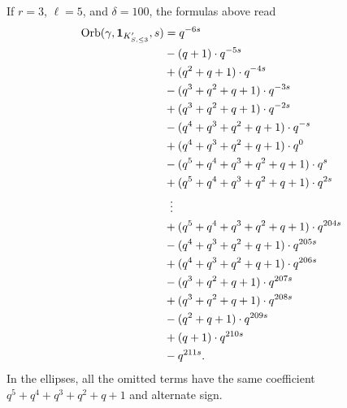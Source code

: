 \begin{example}
  If $r=3$, $\ell=5$, and $\delta=100$, the formulas above read
  \begin{align*}
  \Orb(\gamma, \mathbf{1}_{K'_{S, \le 3}}, s)
  &= q^{-6s} \\
  &- (q+1) \cdot q^{-5s} \\
  &+ (q^2+q+1) \cdot q^{-4s} \\
  &- (q^3+q^2+q+1) \cdot q^{-3s} \\
  &+ (q^3+q^2+q+1) \cdot q^{-2s} \\
  &- (q^4+q^3+q^2+q+1) \cdot q^{-s} \\
  &+ (q^4+q^3+q^2+q+1) \cdot q^{0} \\
  &- (q^5+q^4+q^3+q^2+q+1) \cdot q^{s} \\
  &+ (q^5+q^4+q^3+q^2+q+1) \cdot q^{2s} \\
  &\vdotswithin= \\
  &+ (q^5+q^4+q^3+q^2+q+1) \cdot q^{204s} \\
  &- (q^4+q^3+q^2+q+1) \cdot q^{205s} \\
  &+ (q^4+q^3+q^2+q+1) \cdot q^{206s} \\
  &- (q^3+q^2+q+1) \cdot q^{207s} \\
  &+ (q^3+q^2+q+1) \cdot q^{208s} \\
  &- (q^2+q+1) \cdot q^{209s} \\
  &+ (q+1) \cdot q^{210s} \\
  &- q^{211s}.
  \end{align*}
  In the ellipses, all the omitted terms
  have the same coefficient $q^5+q^4+q^3+q^2+q+1$
  and alternate sign.
\end{example}

